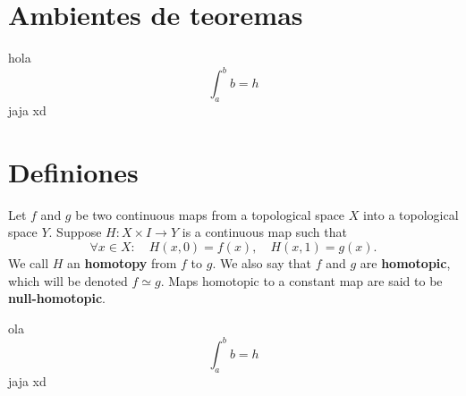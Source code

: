 \section{Ambientes de teoremas}

\lipsum[1]

\begin{theorem}
    hola \[\int_a^b b = h\]
    jaja xd
\end{theorem}

\lipsum[1]

\section{Definiones}

\lipsum[1]

\begin{definition}
    Let \(f\) and \(g\) be two continuous maps from a topological space \(X\) into a topological space \(Y\). Suppose \(H \colon X\times I \to Y\) is a continuous map such that 
    \[
        \forall x\in X :\quad H(x,0) = f(x), \quad H(x,1) = g(x).
    \]
    We call \(H\) an \textbf{homotopy} from \(f\) to \(g\). We also say that \(f\) and \(g\) are \textbf{homotopic}, which will be denoted \(f\simeq g\). Maps homotopic to a constant map are said to be \textbf{null-homotopic}.
\end{definition}

\lipsum[1]

\begin{theorem}ola \[\int_a^b b = h\]
    jaja xd
\end{theorem}

\lipsum[1]


